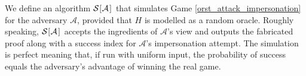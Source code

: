 \documentclass{iacrtrans}
\begin{document}
We define an algorithm
$
\mathcal{S}
		\hspace{.5pt}
		[
			\hspace{0.5pt}
			\mathcal{A}
			\hspace{1pt}
		]
		\hspace{0.5pt}
$
that simulates Game \ref{orst_attack_impersonation}
for the adversary $\mathcal{A}$,
provided that $H$ is modelled as a random oracle.
Roughly speaking,
$
\mathcal{S}
		\hspace{.5pt}
		[
			\hspace{0.5pt}
			\mathcal{A}
			\hspace{1pt}
		]
		\hspace{0.5pt}
$
accepts
the ingredients of $\mathcal{A}$'s view and outputs
the fabricated proof along with
a success index for $\mathcal{A}$'s impersonation attempt.
The simulation is perfect meaning that,
if run with uniform input,
the probability of success equals
the adversary's advantage of
winning the real game.
\end{document}
